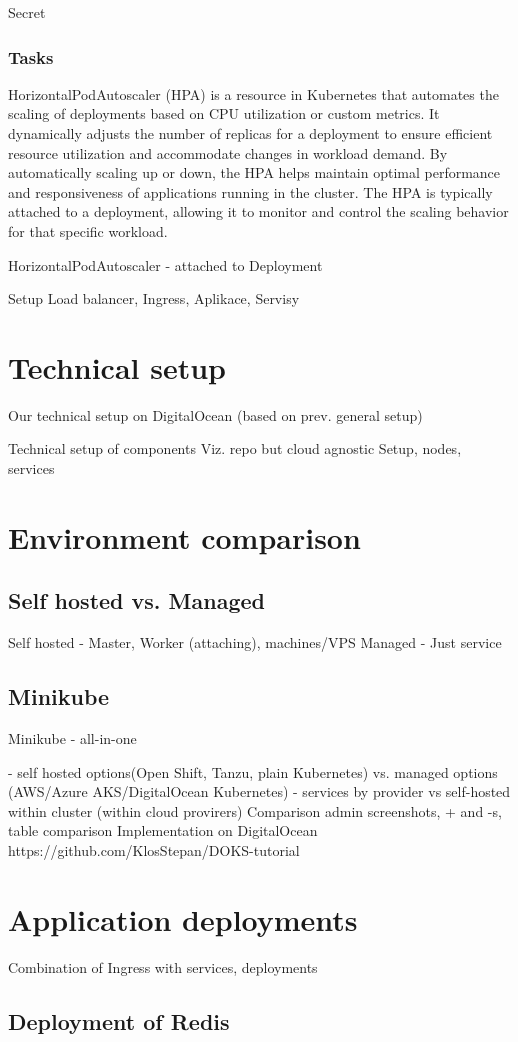 \documentclass{article}
\begin{document}
Secret
\subsubsection{Tasks}
HorizontalPodAutoscaler (HPA) is a resource in Kubernetes that automates the scaling of deployments based on CPU utilization or custom metrics. It dynamically adjusts the number of replicas for a deployment to ensure efficient resource utilization and accommodate changes in workload demand. By automatically scaling up or down, the HPA helps maintain optimal performance and responsiveness of applications running in the cluster. The HPA is typically attached to a deployment, allowing it to monitor and control the scaling behavior for that specific workload.

HorizontalPodAutoscaler - attached to Deployment

Setup Load balancer, Ingress, Aplikace, Servisy
\section{Technical setup}
Our technical setup on DigitalOcean (based on prev. general setup) \par
Technical setup of components
Viz. repo but cloud agnostic
Setup, nodes, services
\section{Environment comparison}
\subsection{Self hosted vs. Managed}
Self hosted - Master, Worker (attaching), machines/VPS
Managed - Just service
\subsection{Minikube}
Minikube - all-in-one

- self hosted options(Open Shift, Tanzu, plain Kubernetes) vs. managed options (AWS/Azure AKS/DigitalOcean Kubernetes)
- services by provider vs self-hosted within cluster (within cloud provirers)
Comparison admin screenshots, + and -s, table comparison
Implementation on DigitalOcean https://github.com/KlosStepan/DOKS-tutorial
\section{Application deployments}
Combination of Ingress with services, deployments
\subsection{Deployment of Redis}
\end{document}
